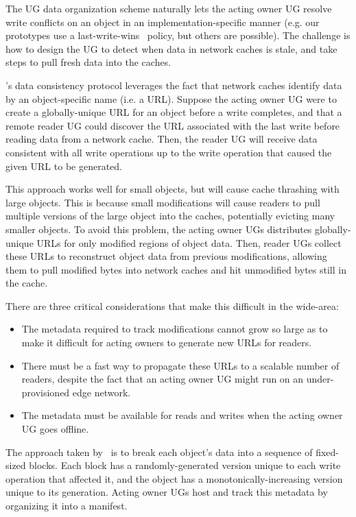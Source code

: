 The UG data organization scheme naturally lets the acting owner UG resolve write conflicts on an object in an implementation-specific manner (e.g. our prototypes use a last-write-wins~\cite{last-write-wins} policy, but others are possible). The challenge is how to design the UG to detect when data in network caches is stale, and take steps to pull fresh data into the caches.

\Syndicate's data consistency protocol leverages the fact that network caches identify data by an object-specific name (i.e. a URL). Suppose the acting owner UG were to create a globally-unique URL for an object before a write completes, and that a remote reader UG could discover the URL associated with the last write before reading data from a network cache. Then, the reader UG will receive data consistent with all write operations up to the write operation that caused the given URL to be generated.

This approach works well for small objects, but will cause cache thrashing with large objects. This is because small modifications will cause readers to pull multiple versions of the large object into the caches, potentially evicting many smaller objects. To avoid this problem, the acting owner UGs distributes globally-unique URLs for only modified regions of object data. Then, reader UGs collect these URLs to reconstruct object data from previous modifications, allowing them to pull modified bytes into network caches and hit unmodified bytes still in the cache.

There are three critical considerations that make this difficult in the wide-area:
\begin{itemize}
\item The metadata required to track modifications cannot grow so large as to make it difficult for acting owners to generate new URLs for readers.
\item There must be a fast way to propagate these URLs to a scalable number of readers, despite the fact that an acting owner UG might run on an under-provisioned edge network.
\item The metadata must be available for reads and writes when the acting owner UG goes offline.
\end{itemize}

The approach taken by \Syndicate\ is to break each object's data into a sequence of fixed-sized blocks. Each block has a randomly-generated version unique to each write operation that affected it, and the object has a monotonically-increasing version unique to its generation. Acting owner UGs host and track this metadata by organizing it into a manifest.

